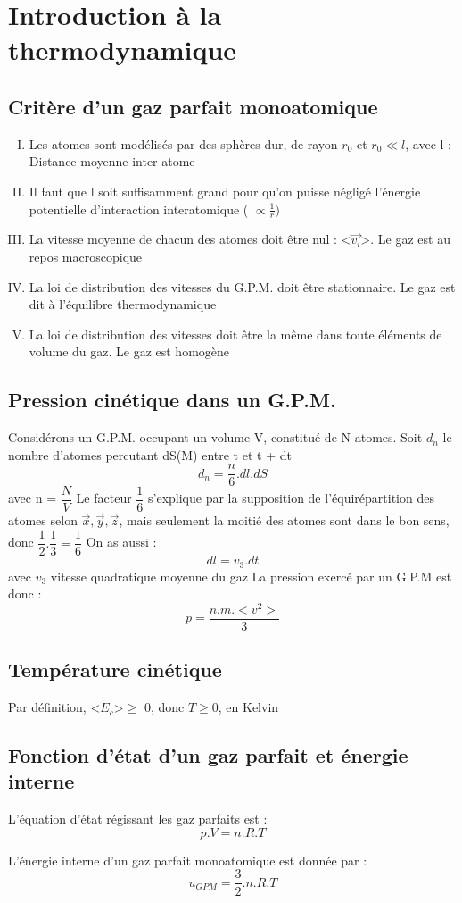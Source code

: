 \chapter{Introduction à la thermodynamique}
\section{Critère d'un gaz parfait monoatomique}
\begin{enumerate}[I) ]
 \item Les atomes sont modélisés par des sphères dur, de rayon $r_0$ et $r_0 \ll l$, avec l : Distance moyenne inter-atome
 \item Il faut que l soit suffisamment grand pour qu'on puisse négligé l'énergie potentielle d'interaction interatomique ( $\propto \frac{1}{r})$
 \item La vitesse moyenne de chacun des atomes doit être nul : <$\overrightarrow{v_i}$>. Le gaz est au repos macroscopique
 \item La loi de distribution des vitesses du G.P.M. doit être stationnaire. Le gaz est dit à l'équilibre thermodynamique
 \item La loi de distribution des vitesses doit être la même dans toute éléments de volume du gaz. Le gaz est homogène
\end{enumerate}
\section{Pression cinétique dans un G.P.M.}
Considérons un G.P.M. occupant un volume V, constitué de N atomes. Soit $d_n$ le nombre d'atomes percutant dS(M) entre t et t + dt
$$d_n = \dfrac{n}{6}.dl.dS$$
avec n = $\dfrac{N}{V}$
Le facteur $\dfrac{1}{6}$ s'explique par la supposition de l'équirépartition des atomes selon $\overrightarrow{x},\overrightarrow{y},\overrightarrow{z}$, mais seulement la moitié des atomes sont dans le bon sens, donc $\dfrac{1}{2}.\dfrac{1}{3} = \dfrac{1}{6}$
On as aussi : 
$$dl = v_3.dt$$
avec $v_3$ vitesse quadratique moyenne du gaz
La pression exercé par un G.P.M est donc : 
$$p = \dfrac{n.m.<v^{2}>}{3}$$
\section{Température cinétique}
\begin{de}
 Par définition, <$E_c$>$\geq$ 0, donc $T \geq 0$, en Kelvin
\end{de}
\section{Fonction d'état d'un gaz parfait et énergie interne}
\begin{de}
 L'équation d'état régissant les gaz parfaits est : 
$$p.V = n.R.T$$
\end{de}
L'énergie interne d'un gaz parfait monoatomique est donnée par : 
$$u_{GPM} = \dfrac{3}{2}.n.R.T$$
